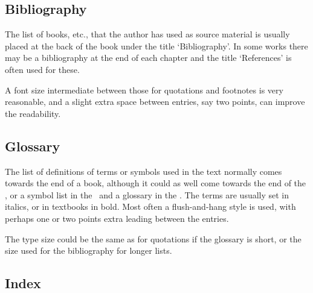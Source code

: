 \documentclass[10pt,a4paper,oneside,extrafontsizes]{memoir}%
\begin{document}
\subsection{Bibliography}

\begin{paracol}{2}
\switchEng
   The list of books, etc., that the author has used as source material is
usually placed at the back of the book under the title `Bibliography'. In
some works there may be a bibliography at the end of 
each chapter and the title `References' is often used for these.

    A font size intermediate between those for quotations and footnotes is
very reasonable, and a slight extra space between entries, say two points,
can improve the readability.
\end{paracol}

\subsection{Glossary}

\begin{paracol}{2}
\switchEng
   The list of definitions of terms or symbols used in the text normally
comes towards the end of a book, although it could as well come towards
the end of the \pixfrontmatter, or a symbol list 
in the \pixfrontmatter\ and a glossary
in the \pixbackmatter. The terms are usually set in italics, or in textbooks 
in bold. Most often a flush-and-hang style is used, with
perhaps one or two points extra leading between the entries.

    The type size could be the same as for quotations if the glossary is short,
or the size used for the bibliography for longer lists.
\end{paracol}

\subsection{Index}
\end{document}
